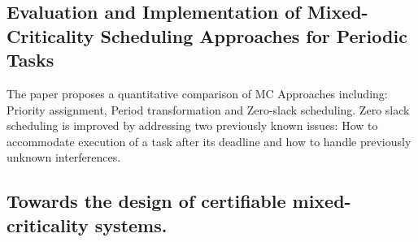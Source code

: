 \subsection{Evaluation and Implementation of Mixed-Criticality Scheduling Approaches for Periodic Tasks}
The paper proposes a quantitative comparison of MC Approaches including: Priority assignment, Period transformation and Zero-slack scheduling.
Zero slack scheduling is improved by addressing two previously known issues: How to accommodate execution of a task after its deadline and how to handle previously unknown interferences.

\subsection{Towards the design of certifiable mixed-criticality systems.}


